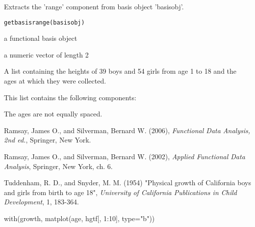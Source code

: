 \documentclass{article}
\begin{document}
\begin{Description}\relax
Extracts the 'range' component from basis object 'basisobj'.
\end{Description}
\begin{Usage}
\begin{verbatim}
getbasisrange(basisobj) 
\end{verbatim}
\end{Usage}
\begin{Arguments}
\begin{ldescription}
\item[\code{basisobj}] a functional basis object 

\end{ldescription}
\end{Arguments}
\begin{Value}
a numeric vector of length 2
\end{Value}

\begin{Description}\relax
A list containing the heights of 39 boys and 54 girls from age 1 to 18
and the ages at which they were collected.
\end{Description}
\begin{Format}\relax
This list contains the following components:
\end{Format}
\begin{Details}\relax
The ages are not equally spaced.
\end{Details}
\begin{Source}\relax
Ramsay, James O., and Silverman, Bernard W. (2006), \emph{Functional
Data Analysis, 2nd ed.}, Springer, New York. 

Ramsay, James O., and Silverman, Bernard W. (2002), \emph{Applied
Functional Data Analysis}, Springer, New York, ch. 6. 

Tuddenham, R. D., and Snyder, M. M. (1954) "Physical growth of
California boys and girls from birth to age 18", \emph{University of
California Publications in Child Development}, 1, 183-364.
\end{Source}
\begin{Examples}
\begin{ExampleCode}
with(growth, matplot(age, hgtf[, 1:10], type="b"))
\end{ExampleCode}
\end{Examples}
\end{document}
